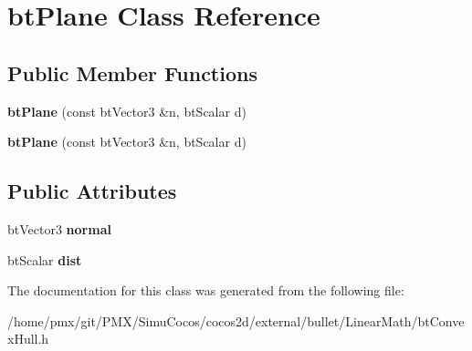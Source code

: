 \hypertarget{classbtPlane}{}\section{bt\+Plane Class Reference}
\label{classbtPlane}
\subsection*{Public Member Functions}
\begin{DoxyCompactItemize}
\item 
\mbox{\label{classbtPlane_a4c452dda8a7800e206893a60ad02e75b}} 
{\bfseries bt\+Plane} (const bt\+Vector3 \&n, bt\+Scalar d)
\item 
\mbox{\label{classbtPlane_a4c452dda8a7800e206893a60ad02e75b}} 
{\bfseries bt\+Plane} (const bt\+Vector3 \&n, bt\+Scalar d)
\end{DoxyCompactItemize}
\subsection*{Public Attributes}
\begin{DoxyCompactItemize}
\item 
\mbox{\label{classbtPlane_a770c93299d0961db906151d4810282ca}} 
bt\+Vector3 {\bfseries normal}
\item 
\mbox{\label{classbtPlane_aba99698f971610f1e330599ca775fe28}} 
bt\+Scalar {\bfseries dist}
\end{DoxyCompactItemize}


The documentation for this class was generated from the following file\+:\begin{DoxyCompactItemize}
\item 
/home/pmx/git/\+P\+M\+X/\+Simu\+Cocos/cocos2d/external/bullet/\+Linear\+Math/bt\+Convex\+Hull.\+h\end{DoxyCompactItemize}
